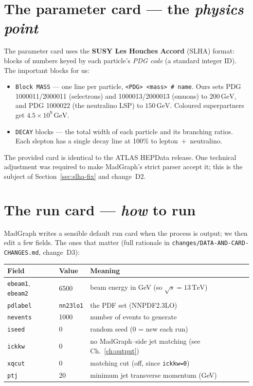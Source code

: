 \documentclass[11pt,oneside]{report}
\newcommand{\code}[1]{\texttt{#1}}
\newcommand{\rts}{\sqrt{s}}
\newcommand{\GeV}{\,\text{GeV}}
\newcommand{\TeV}{\,\text{TeV}}
\begin{document}
\section{The parameter card --- the \emph{physics point}}
The parameter card uses the \textbf{SUSY Les Houches Accord} (SLHA) format: blocks of numbers keyed
by each particle's \emph{PDG code} (a standard integer ID). The important blocks for us:
\begin{itemize}[nosep]
  \item \code{Block MASS} --- one line per particle, \code{<PDG> <mass> \# name}. Ours sets PDG
        1000011/2000011 (selectrons) and 1000013/2000013 (smuons) to $200\GeV$, and PDG 1000022
        (the neutralino LSP) to $150\GeV$. Coloured superpartners get $4.5\times10^{9}\GeV$.
  \item \code{DECAY} blocks --- the total width of each particle and its branching ratios. Each
        slepton has a single decay line at 100\% to lepton~$+$~neutralino.
\end{itemize}
The provided card is identical to the ATLAS HEPData release. One technical adjustment was required
to make MadGraph's strict parser accept it; this is the subject of Section~\ref{sec:slha-fix} and
change~D2.

\section{The run card --- \emph{how} to run}
MadGraph writes a sensible default run card when the process is output; we then edit a few fields.
The ones that matter (full rationale in \code{changes/DATA-AND-CARD-CHANGES.md}, change~D3):
\begin{center}\small
\begin{tabular}{@{}lll@{}}
\toprule
Field & Value & Meaning \\
\midrule
\code{ebeam1}, \code{ebeam2} & 6500 & beam energy in GeV (so $\rts=13\TeV$) \\
\code{pdlabel} & \code{nn23lo1} & the PDF set (NNPDF2.3LO) \\
\code{nevents} & 1000 & number of events to generate \\
\code{iseed} & 0 & random seed (0 = new each run) \\
\code{ickkw} & 0 & no MadGraph--side jet matching (see Ch.~\ref{ch:output}) \\
\code{xqcut} & 0 & matching cut (off, since \code{ickkw=0}) \\
\code{ptj} & 20 & minimum jet transverse momentum (GeV) \\
\bottomrule
\end{tabular}
\end{center}
\end{document}
